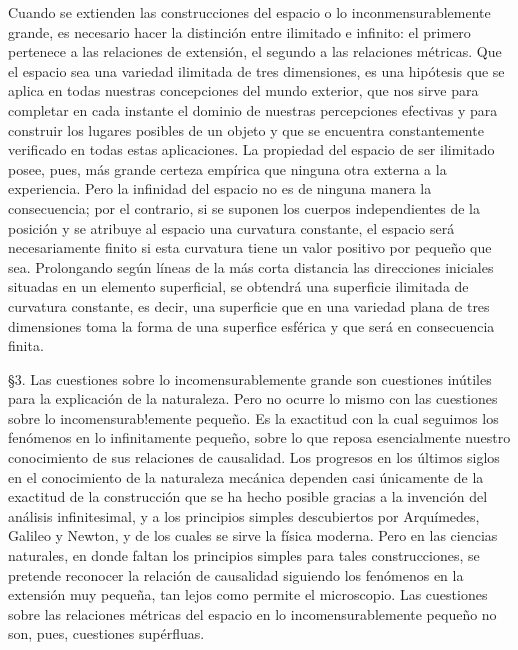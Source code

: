 \documentclass[a4paper, 12pt]{article}
\begin{document}
Cuando se extienden las construcciones del espacio o lo inconmensurablemente grande, es necesario hacer la distinción entre ilimitado e infinito: el primero pertenece a las relaciones de 
extensión, el segundo a las relaciones métricas. Que el espacio sea una variedad ilimitada de tres dimensiones, es una hipótesis que se aplica en todas nuestras concepciones del mundo exterior, que nos sirve para completar en cada instante el dominio de nuestras percepciones efectivas y para construir los lugares posibles de un objeto y que se encuentra constantemente verificado en todas estas aplicaciones. La propiedad del espacio de ser ilimitado posee, pues, más grande certeza empírica que ninguna otra externa a la experiencia. Pero la infinidad del espacio no es de ninguna manera la consecuencia; por el contrario, si se suponen los cuerpos independientes de la posición y se atribuye al espacio una curvatura constante, el espacio será necesariamente finito si esta curvatura tiene un valor positivo por pequeño que sea. Prolongando según líneas de la más corta distancia las direcciones iniciales situadas en un elemento superficial, se obtendrá una superficie ilimitada de curvatura constante, es decir, una superficie que en una variedad plana de tres dimensiones toma la forma de una superfice esférica y que será en consecuencia finita.


\bigskip

\S 3.\hspace{3 mm} Las cuestiones sobre lo incomensurablemente grande son cuestiones inútiles para la explicación de la naturaleza. Pero no ocurre lo mismo con las cuestiones sobre lo incomensurab!emente pequeño. Es la exactitud con la cual seguimos los fenómenos en lo infinitamente pequeño, sobre lo que reposa esencialmente nuestro conocimiento de sus relaciones de causalidad. Los progresos en los últimos siglos en el conocimiento de la naturaleza mecánica dependen casi únicamente de la exactitud de la construcción que se ha hecho posible gracias a la invención del análisis infinitesimal, y a los principios simples descubiertos por Arquímedes, Galileo y Newton, y de los cuales se sirve la física moderna. Pero en las ciencias naturales, en donde faltan los principios simples para tales construcciones, se pretende reconocer la relación de causalidad siguiendo los fenómenos en la extensión muy pequeña, tan lejos como permite el microscopio. Las cuestiones sobre las relaciones métricas del espacio en lo incomensurablemente pequeño no son, pues, cuestiones supérfluas.
\end{document}
